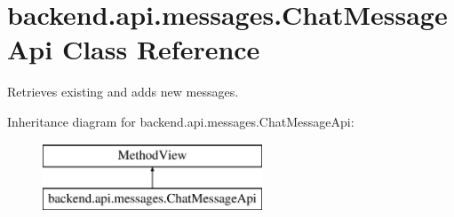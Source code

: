 \hypertarget{classbackend_1_1api_1_1messages_1_1_chat_message_api}{}\section{backend.\+api.\+messages.\+Chat\+Message\+Api Class Reference}
\label{classbackend_1_1api_1_1messages_1_1_chat_message_api}


Retrieves existing and adds new messages.  


Inheritance diagram for backend.\+api.\+messages.\+Chat\+Message\+Api\+:\begin{figure}[H]
\begin{center}
\leavevmode
\includegraphics[height=2.000000cm]{classbackend_1_1api_1_1messages_1_1_chat_message_api}
\end{center}
\end{figure}
